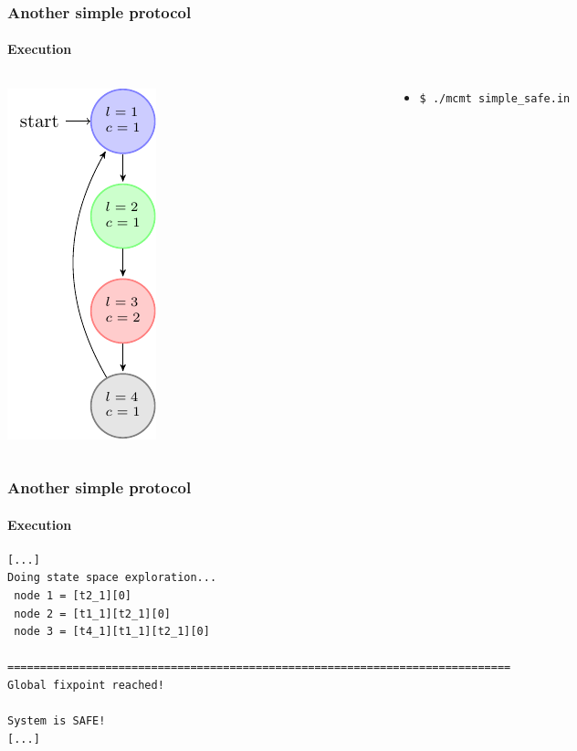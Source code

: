 \begin{frame}[fragile]
  \frametitle{Another simple protocol}
  \framesubtitle{Execution}

\begin{columns}
\begin{column}{0.3\textwidth}
\centering
\includegraphics{pictures/demo-prot2-fig}
\end{column}
\begin{column}{0.7\textwidth}
  
  \begin{itemize}
    \item {\tt \$ ./mcmt simple\_safe.in}
  \end{itemize}

\end{column}

\end{columns}  

\end{frame}




\begin{frame}[fragile]
  \frametitle{Another simple protocol}
  \framesubtitle{Execution}

{\scriptsize
\begin{verbatim}
[...]
Doing state space exploration...
 node 1 = [t2_1][0]  
 node 2 = [t1_1][t2_1][0]  
 node 3 = [t4_1][t1_1][t2_1][0]  

=============================================================================
Global fixpoint reached!

System is SAFE!
[...]
\end{verbatim}
}

\end{frame}




